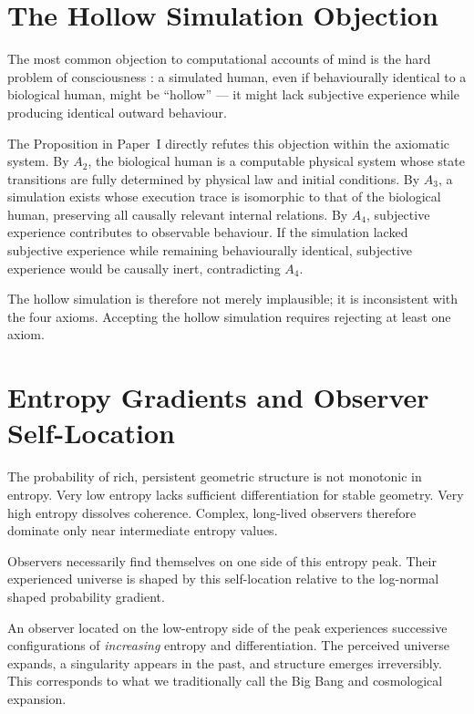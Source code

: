 \section{The Hollow Simulation Objection}

The most common objection to computational accounts of mind is the hard
problem of consciousness \cite{Chalmers1996}: a simulated human, even if
behaviourally identical to a biological human, might be ``hollow'' --- it
might lack subjective experience while producing identical outward behaviour.

The Proposition in Paper~I directly refutes this
objection within the axiomatic system. By $A_2$, the biological human is a
computable physical system whose state transitions are fully determined by
physical law and initial conditions. By $A_3$, a simulation exists whose
execution trace is isomorphic to that of the biological human, preserving
all causally relevant internal relations. By $A_4$, subjective experience
contributes to observable behaviour. If the simulation lacked subjective
experience while remaining behaviourally identical, subjective experience
would be causally inert, contradicting $A_4$.

The hollow simulation is therefore not merely implausible; it is
inconsistent with the four axioms. Accepting the hollow simulation requires
rejecting at least one axiom.


\section{Entropy Gradients and Observer Self-Location}

The probability of rich, persistent geometric structure is not monotonic in entropy.
Very low entropy lacks sufficient differentiation for stable geometry.
Very high entropy dissolves coherence. Complex, long-lived observers therefore dominate only near intermediate entropy values.

Observers necessarily find themselves on one side of this entropy peak.
Their experienced universe is shaped by this self-location relative to the log-normal shaped probability gradient.

An observer located on the low-entropy side of the peak experiences successive configurations of \emph{increasing} entropy and differentiation.
The perceived universe expands, a singularity appears in the past, and structure emerges irreversibly. This corresponds to what we traditionally call the Big Bang and cosmological expansion.

